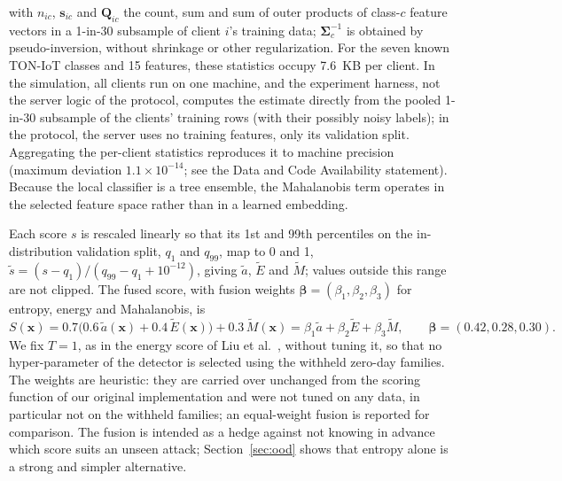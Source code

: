\documentclass[pdflatex,sn-mathphys-num]{sn-jnl}
\begin{document}
{{with $n_{ic}$, $\mathbf{s}_{ic}$ and $\mathbf{Q}_{ic}$ the count, sum and sum of outer products of class-$c$ feature vectors in a 1-in-30 subsample of client $i$'s training data; $\boldsymbol{\Sigma}_c^{-1}$ is obtained by pseudo-inversion, without shrinkage or other regularization. For the seven known TON-IoT classes and 15 features, these statistics occupy 7.6~KB per client. In the simulation, all clients run on one machine, and the experiment harness, not the server logic of the protocol, computes the estimate directly from the pooled 1-in-30 subsample of the clients' training rows (with their possibly noisy labels); in the protocol, the server uses no training features, only its validation split. Aggregating the per-client statistics reproduces it to machine precision (maximum deviation $1.1\times10^{-14}$; see the Data and Code Availability statement). Because the local classifier is a tree ensemble, the Mahalanobis term operates in the selected feature space rather than in a learned embedding.

Each score $s$ is rescaled linearly so that its 1st and 99th percentiles on the in-distribution validation split, $q_1$ and $q_{99}$, map to 0 and 1, $\tilde s=(s-q_{1})/(q_{99}-q_{1}+10^{-12})$, giving $\tilde a$, $\tilde E$ and $\tilde M$; values outside this range are not clipped. The fused score, with fusion weights $\boldsymbol{\beta}=(\beta_1,\beta_2,\beta_3)$ for entropy, energy and Mahalanobis, is
\begin{equation}
S(\mathbf{x})=0.7\big(0.6\,\tilde a(\mathbf{x})+0.4\,\tilde E(\mathbf{x})\big)+0.3\,\tilde M(\mathbf{x})=\beta_1\tilde a+\beta_2\tilde E+\beta_3\tilde M,\qquad \boldsymbol{\beta}=(0.42,0.28,0.30).\label{eq:fusion}
\end{equation}
We fix $T=1$, as in the energy score of Liu et al.\ \cite{liu2020energy}, without tuning it, so that no hyper-parameter of the detector is selected using the withheld zero-day families.
The weights are heuristic: they are carried over unchanged from the scoring function of our original implementation and were not tuned on any data, in particular not on the withheld families; an equal-weight fusion is reported for comparison. The fusion is intended as a hedge against not knowing in advance which score suits an unseen attack; Section~\ref{sec:ood} shows that entropy alone is a strong and simpler alternative.}
}
\end{document}
